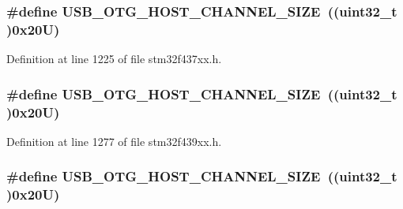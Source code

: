 \subsubsection[{\texorpdfstring{U\+S\+B\+\_\+\+O\+T\+G\+\_\+\+H\+O\+S\+T\+\_\+\+C\+H\+A\+N\+N\+E\+L\+\_\+\+S\+I\+ZE}{USB_OTG_HOST_CHANNEL_SIZE}}]{\setlength{\rightskip}{0pt plus 5cm}\#define U\+S\+B\+\_\+\+O\+T\+G\+\_\+\+H\+O\+S\+T\+\_\+\+C\+H\+A\+N\+N\+E\+L\+\_\+\+S\+I\+ZE~((uint32\+\_\+t )0x20\+U)}\hypertarget{group___peripheral__memory__map_ga266cb1dbb50faf447f9c15d2ee93a522}{}\label{group___peripheral__memory__map_ga266cb1dbb50faf447f9c15d2ee93a522}


Definition at line 1225 of file stm32f437xx.\+h.

\subsubsection[{\texorpdfstring{U\+S\+B\+\_\+\+O\+T\+G\+\_\+\+H\+O\+S\+T\+\_\+\+C\+H\+A\+N\+N\+E\+L\+\_\+\+S\+I\+ZE}{USB_OTG_HOST_CHANNEL_SIZE}}]{\setlength{\rightskip}{0pt plus 5cm}\#define U\+S\+B\+\_\+\+O\+T\+G\+\_\+\+H\+O\+S\+T\+\_\+\+C\+H\+A\+N\+N\+E\+L\+\_\+\+S\+I\+ZE~((uint32\+\_\+t )0x20\+U)}\hypertarget{group___peripheral__memory__map_ga266cb1dbb50faf447f9c15d2ee93a522}{}\label{group___peripheral__memory__map_ga266cb1dbb50faf447f9c15d2ee93a522}


Definition at line 1277 of file stm32f439xx.\+h.

\subsubsection[{\texorpdfstring{U\+S\+B\+\_\+\+O\+T\+G\+\_\+\+H\+O\+S\+T\+\_\+\+C\+H\+A\+N\+N\+E\+L\+\_\+\+S\+I\+ZE}{USB_OTG_HOST_CHANNEL_SIZE}}]{\setlength{\rightskip}{0pt plus 5cm}\#define U\+S\+B\+\_\+\+O\+T\+G\+\_\+\+H\+O\+S\+T\+\_\+\+C\+H\+A\+N\+N\+E\+L\+\_\+\+S\+I\+ZE~((uint32\+\_\+t )0x20\+U)}\hypertarget{group___peripheral__memory__map_ga266cb1dbb50faf447f9c15d2ee93a522}{}\label{group___peripheral__memory__map_ga266cb1dbb50faf447f9c15d2ee93a522}


